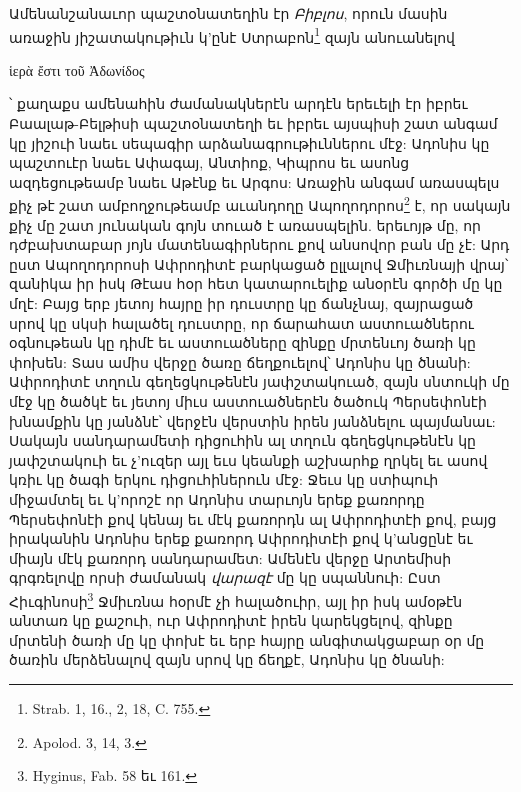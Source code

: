 \documentclass{article}
\begin{document}
{Ամենանշանաւոր պաշտօնատեղին էր \emph{Բիբլոս}, որուն մասին առաջին յիշատակութիւն կ'ընէ Ստրաբոն\footnote{Strab. 1, 16., 2, 18, C. 755.} զայն անուանելով \begin{greek}ἱερὰ ἔστι τοῦ Ἀδωνίδος\end{greek}՝ քաղաքս ամենահին ժամանակներէն արդէն երեւելի էր իբրեւ Բաալաթ-Բելթիսի պաշտօնատեղի եւ իբրեւ այսպիսի շատ անգամ կը յիշուի նաեւ սեպագիր արձանագրութիւններու մէջ: Ադոնիս կը պաշտուէր նաեւ Ափագայ, Անտիոք, Կիպրոս եւ ասոնց ազդեցութեամբ նաեւ Աթէնք եւ Արգոս: Առաջին անգամ առասպելս քիչ թէ շատ ամբողջութեամբ աւանդողը Ապողոդորոս\footnote{Apolod. 3, 14, 3.} է, որ սակայն քիչ մը շատ յունական գոյն տուած է առասպելին. երեւոյթ մը, որ դժբախտաբար յոյն մատենագիրներու քով անսովոր բան մը չէ: Արդ ըստ Ապողոդորոսի Ափրոդիտէ բարկացած ըլլալով Ջմիւռնայի վրայ՝ զանիկա իր իսկ Թէաս հօր հետ կատարուելիք անօրէն գործի մը կը մղէ: Բայց երբ յետոյ հայրը իր դուստրը կը ճանչնայ, զայրացած սրով կը սկսի հալածել դուստրը, որ ճարահատ աստուածներու օգնութեան կը դիմէ եւ աստուածները զինքը մրտենւոյ ծառի կը փոխեն: Տաս ամիս վերջը ծառը ճեղքուելով՝ Ադոնիս կը ծնանի: Ափրոդիտէ տղուն գեղեցկութենէն յափշտակուած, զայն սնտուկի մը մէջ կը ծածկէ եւ յետոյ միւս աստուածներէն ծածուկ Պերսեփոնէի խնամքին կը յանձնէ՝ վերջէն վերստին իրեն յանձնելու պայմանաւ: Սակայն սանդարամետի դիցուհին ալ տղուն գեղեցկութենէն կը յափշտակուի եւ չ'ուզեր այլ եւս կեանքի աշխարհք ղրկել եւ ասով կռիւ կը ծագի երկու դիցուհիներուն մէջ: Ջեւս կը ստիպուի միջամտել եւ կ'որոշէ որ Ադոնիս տարւոյն երեք քառորդը Պերսեփոնէի քով կենայ եւ մէկ քառորդն ալ Ափրոդիտէի քով, բայց իրականին Ադոնիս երեք քառորդ Ափրոդիտէի քով կ'անցընէ եւ միայն մէկ քառորդ սանդարամետ: Ամենէն վերջը Արտեմիսի գրգռելովը որսի ժամանակ \emph{վարազէ} մը կը սպաննուի: Ըստ Հիւգինոսի\footnote{Hyginus, Fab. 58 եւ 161.} Ջմիւռնա հօրմէ չի հալածուիր, այլ իր իսկ ամօթէն անտառ կը քաշուի, ուր Ափրոդիտէ իրեն կարեկցելով, զինքը մրտենի ծառի մը կը փոխէ եւ երբ հայրը անգիտակցաբար օր մը ծառին մերձենալով զայն սրով կը ճեղքէ, Ադոնիս կը ծնանի:

}
\end{document}
